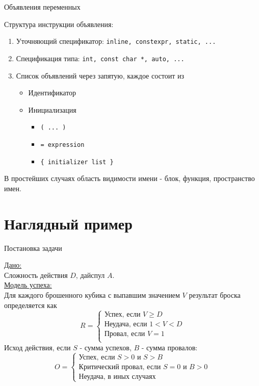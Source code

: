\documentclass[unknownkeysallowed]{beamer}
\begin{document}
\begin{frame}[fragile]{Объявления переменных}

Структура инструкции объявления:
\begin{enumerate}
  \item Уточняющий спецификатор: \lstinline[basicstyle=\ttfamily\small]{inline, constexpr, static, ...}
  \item Спецификация типа: \lstinline[basicstyle=\ttfamily\small]{int, const char *, auto, ...}
  \item Список объявлений через запятую, каждое состоит из
    \begin{itemize}
      \item Идентификатор
      \item Инициализация
        \begin{itemize}
          \item \lstinline[basicstyle=\ttfamily\small]{( ... )}
          \item \lstinline[basicstyle=\ttfamily\small]{= expression}
          \item \lstinline[basicstyle=\ttfamily\small]|{ initializer list }|
        \end{itemize}
    \end{itemize}
\end{enumerate}

В простейших случаях область видимости имени - блок, функция, пространство имен.

\end{frame}


\section{Наглядный пример}

\begin{frame}{Постановка задачи}

\underline{Дано:}\\
Сложность действия $D$, дайспул $A$.\\
\vspace{1em}
\underline{Модель успеха:}\\
Для каждого брошенного кубика с выпавшим значением $V$ результат броска определяется как
\[
R =
\begin{cases}
  \text{Успех, если $V \ge D$}\\
  \text{Неудача, если $1 < V < D$}\\
  \text{Провал, если $V = 1$}\\
\end{cases}
\]
Исход действия, если $S$ - сумма успехов, $B$ - сумма провалов:
\[
O =
\begin{cases}
  \text{Успех, если $S > 0$ и $S > B$}\\
  \text{Критический провал, если $S = 0$ и $B > 0$}\\
  \text{Неудача, в иных случаях}
\end{cases}
\]
  
\end{frame}
\end{document}
